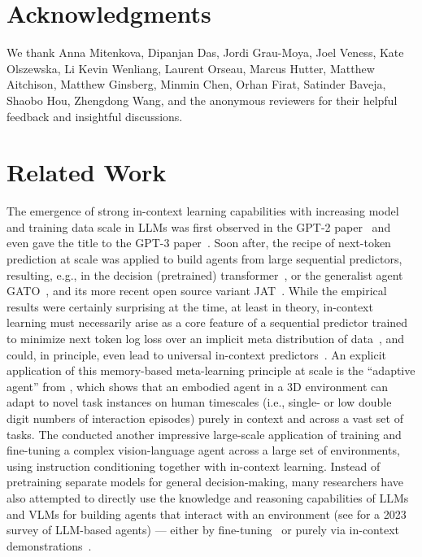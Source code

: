 \documentclass{article}
\newcommand{\eg}{e.g., }
\newcommand{\ie}{i.e., }
\begin{document}
    \section*{Acknowledgments}
We thank
Anna Mitenkova,
Dipanjan Das,
Jordi Grau-Moya,
Joel Veness,
Kate Olszewska,
Li Kevin Wenliang,
Laurent Orseau,
Marcus Hutter,
Matthew Aitchison,
Matthew Ginsberg,
Minmin Chen,
Orhan Firat,
Satinder Baveja,
Shaobo Hou,
Zhengdong Wang,
and the anonymous reviewers
for their helpful feedback and insightful discussions.
    
    
    \clearpage
    \appendix
    \onecolumn
    \setcounter{figure}{0}
    \renewcommand{\thefigure}{A\arabic{figure}}
    \setcounter{table}{0}
    \renewcommand{\thetable}{A\arabic{table}}
    \section{Related Work}
\label{app:related-work}
The emergence of strong in-context learning capabilities with increasing model and training data scale in LLMs was first observed in the GPT-2 paper~\citep{radford2019language} and even gave the title to the GPT-3 paper~\citep{brown2020language}.
Soon after, the recipe of next-token prediction at scale was applied to build agents from large sequential predictors, resulting, \eg in the decision (pretrained) transformer~\citep{chen2021decision, lee2023supervised}, or the generalist agent GATO~\citep{reed2022generalist}, and its more recent open source variant JAT~\citep{gallouedec2024jack}.
While the empirical results were certainly surprising at the time, at least in theory, in-context learning must necessarily arise as a core feature of a sequential predictor trained to minimize next token log loss over an implicit meta distribution of data~\citep{ortega2019meta, mikulik2020meta, genewein2023memory}, and could, in principle, even lead to universal in-context predictors~\citep{grau2024learning}.
An explicit application of this memory-based meta-learning principle at scale is the ``adaptive agent'' from \citet{bauer2023human}, which shows that an embodied agent in a 3D environment can adapt to novel task instances on human timescales (\ie single- or low double digit numbers of interaction episodes) purely in context and across a vast set of tasks.
The \citet{sima2024scaling} conducted another impressive large-scale application of training and fine-tuning a complex vision-language agent across a large set of environments, using instruction conditioning together with in-context learning.
Instead of pretraining separate models for general decision-making, many researchers have also attempted to directly use the knowledge and reasoning capabilities of LLMs and VLMs for building agents that interact with an environment (see \citet{xi2025rise} for a 2023 survey of LLM-based agents) --- either by fine-tuning~\citep{li2022pretrained} or purely via in-context demonstrations~\citep{dipalo2024keypoint}.
\end{document}
